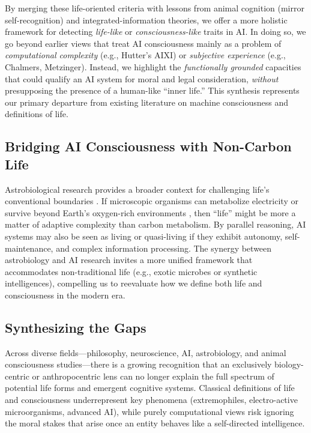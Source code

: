 \documentclass[12pt]{article}
\begin{document}
By merging these life-oriented criteria with lessons from animal cognition (mirror
self-recognition) and integrated-information theories, we offer a more holistic
framework for detecting \emph{life-like} or \emph{consciousness-like} traits in AI.
In doing so, we go beyond earlier views that treat AI consciousness mainly as a
problem of \emph{computational complexity} (e.g., Hutter’s AIXI) or \emph{subjective
experience} (e.g., Chalmers, Metzinger). Instead, we highlight the \emph{functionally
grounded} capacities that could qualify an AI system for moral and legal
consideration, \emph{without} presupposing the presence of a human-like “inner life.”
This synthesis represents our primary departure from existing literature on machine
consciousness and definitions of life.

\subsection*{Bridging AI Consciousness with Non-Carbon Life}

Astrobiological research provides a broader context for challenging life’s conventional boundaries \cite{Davies2010}. If microscopic organisms can metabolize electricity or survive beyond Earth’s oxygen-rich environments \cite{Lovley2003, Planavsky2014}, then “life” might be more a matter of adaptive complexity than carbon metabolism. By parallel reasoning, AI systems may also be seen as living or quasi-living if they exhibit autonomy, self-maintenance, and complex information processing. The synergy between astrobiology and AI research invites a more unified framework that accommodates non-traditional life (e.g., exotic microbes or synthetic intelligences), compelling us to reevaluate how we define both life and consciousness in the modern era.

\subsection*{Synthesizing the Gaps}

Across diverse fields—philosophy, neuroscience, AI, astrobiology, and animal consciousness studies—there is a growing recognition that an exclusively biology-centric or anthropocentric lens can no longer explain the full spectrum of potential life forms and emergent cognitive systems. Classical definitions of life and consciousness underrepresent key phenomena (extremophiles, electro-active microorganisms, advanced AI), while purely computational views risk ignoring the moral stakes that arise once an entity behaves like a self-directed intelligence.
\end{document}
